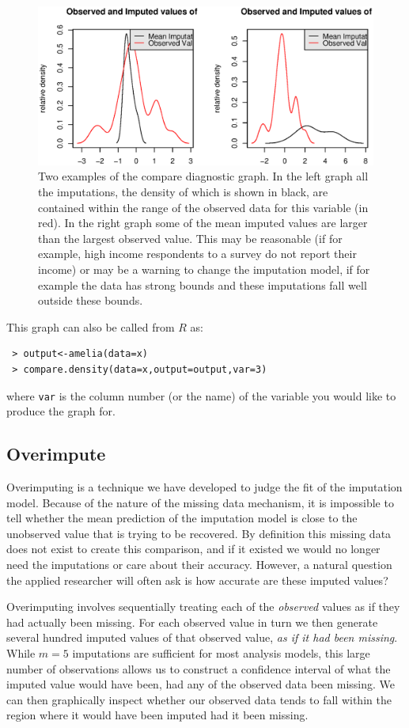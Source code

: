 \documentclass[12pt,titlepage]{article}
\begin{document}
\begin{figure}[htp!]\label{f:oi}
  \centering
  \includegraphics[scale=.8]{comp.eps}
  \caption{ Two examples of the compare diagnostic graph.  In the left graph all the imputations, the density of which is shown in black, are contained within the range of the observed data for this variable (in red).  In the right graph some of the mean imputed values are larger than the largest observed value.  This may be reasonable (if for example, high income respondents to a survey do not report their income) or may be a warning to change the imputation model, if for example the data has strong bounds and these imputations fall well outside these bounds.}
\end{figure}


This graph can also be called from $R$ as:
\begin{verbatim}
 > output<-amelia(data=x) 
 > compare.density(data=x,output=output,var=3)
\end{verbatim}
where \texttt{var} is the column number (or the name) of the variable you would like to produce the graph for.  

\subsection{Overimpute}
\label{sec:overimpute}
Overimputing is a technique we have developed to judge the fit of the imputation model.  Because of the nature of the missing data mechanism, it is impossible to tell whether the mean prediction of the imputation model is close to the unobserved value that is trying to be recovered.  By definition this missing data does not exist to create this comparison, and if it existed we would no longer need the imputations or care about their accuracy.  However, a natural question the applied researcher will often ask is how accurate are these imputed values?  

Overimputing involves sequentially treating each of the \emph{observed} values as if they had actually been missing.  For each observed value in turn we then generate several hundred imputed values of that observed value, \emph{as if it had been missing}.  While $m=5$ imputations are sufficient for most analysis models, this large number of observations allows us to construct a confidence interval of what the imputed value would have been, had any of the observed data been missing.  We can then graphically inspect whether our observed data tends to fall within the region where it would have been imputed had it been missing.
\end{document}
